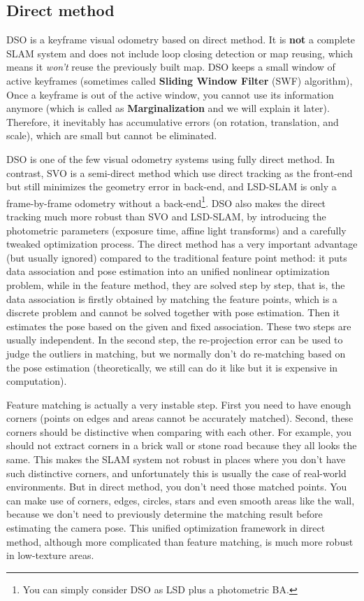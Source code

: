 \documentclass[a4paper,10pt]{article}
\begin{document}
	\subsection{Direct method}
	DSO is a keyframe visual odometry based on direct method. It is \textbf{not} a complete SLAM system and does not include loop closing detection or map reusing, which means it \emph{won't} reuse the previously built map. DSO keeps a small window of active keyframes (sometimes called \textbf{Sliding Window Filter} (SWF) algorithm), Once a keyframe is out of the active window, you cannot use its information anymore (which is called as \textbf{Marginalization} and we will explain it later). Therefore, it inevitably has accumulative errors (on rotation, translation, and scale), which are small but cannot be eliminated. 
	
	DSO is one of the few visual odometry systems using fully direct method. In contrast, SVO \cite{forster2014svo} is a semi-direct method which use direct tracking as the front-end but still minimizes the geometry error in back-end, and LSD-SLAM \cite{engel2014lsd} is only a frame-by-frame odometry without a back-end\footnote{You can simply consider DSO as LSD plus a photometric BA.}. DSO also makes the direct tracking much more robust than SVO and LSD-SLAM, by introducing the photometric parameters (exposure time, affine light transforms) and a carefully tweaked optimization process. The direct method has a very important advantage (but usually ignored) compared to the traditional feature point method: it puts data association and pose estimation into an unified nonlinear optimization problem, while in the feature method, they are solved step by step, that is, the data association is firstly obtained by matching the feature points, which is a discrete problem and cannot be solved together with pose estimation. Then it estimates the pose based on the given and fixed association. These two steps are usually independent. In the second step, the re-projection error can be used to judge the outliers in matching, but we normally don't do re-matching based on the pose estimation (theoretically, we still can do it like \cite{bowman2017probabilistic} but it is expensive in computation). 
	
	Feature matching is actually a very instable step. First you need to have enough corners (points on edges and areas cannot be accurately matched). Second, these corners should be distinctive when comparing with each other. For example, you should not extract corners in a brick wall or stone road because they all looks the same. This makes the SLAM system not robust in places where you don't have such distinctive corners, and unfortunately this is usually the case of real-world environments. But in direct method, you don't need those matched points. You can make use of corners, edges, circles, stars and even smooth areas like the wall, because we don't need to previously determine the matching result before estimating the camera pose. This unified optimization framework in direct method, although more complicated than feature matching, is much more robust in low-texture areas. 
	
\end{document}
